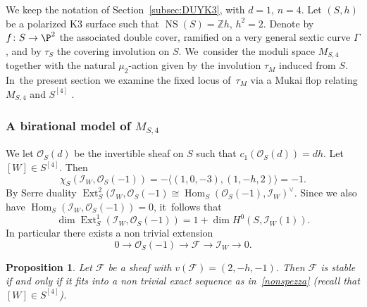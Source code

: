 \documentclass[JEP,XML,SOM,Unicode,published]{cedram}
\newcommand{\ZZ}{{\mathbb Z}}\let\Z\ZZ
\newcommand\cF{\mathcal{F}}
\newcommand\cI{\mathcal{I}}
\newcommand\cO{\mathcal{O}}
\DeclareMathOperator{\Ext}{Ext}
\DeclareMathOperator{\Hom}{Hom}
\DeclareMathOperator{\NS}{NS}
\let\la\langle
\newtheorem{prop}[lemm]{Proposition}
\theoremstyle{definition}
\begin{document}
We keep the notation of Section~\ref{subsec:DUYK3}, with $d=1$, $n=4$.
Let $(S,h)$ be a polarized K3 surface such that $\NS(S)=\ZZ h$, $h^2=2$. Denote by $f\colon S\to \P^2$ the associated double cover, ramified on a very general sextic curve $\mathsf{\Gamma}$, and by $\tau_S$ the covering involution on $S$. We~consider the moduli space $M_{S,4}$ together with the natural $\mu_2$-action given by the involution $\tau_M$ induced from $S$. In~the present section we examine the fixed locus of~$\tau_M$ via a Mukai flop relating $M_{S,4}$ and $S^{[4]}$ .

\subsubsection*{A birational model of $M_{S,4}$}

We let $\cO_S(d)$ be the invertible sheaf on $S$ such that $c_1(\cO_S(d))=dh$.
Let $[W]\in S^{[4]}$. Then
\begin{equation*}
\chi_S(\cI_W,\cO_S(-1))=-\la (1,0,-3),(1,-h,2)\rangle=-1.
\end{equation*}
By Serre duality
$\Ext^2_S(\cI_W,\cO_S(-1)\cong \Hom_S(\cO_S(-1),\cI_W)^{\vee}$. Since we also have $\Hom_S(\cI_W,\cO_S(-1))=0$, it~follows that
\begin{equation}\label{extacca}
\dim\Ext^1_S(\cI_W,\cO_S(-1))=1+\dim H^0(S,\cI_W(1)).
\end{equation}
In particular there exists a non trivial extension
\begin{equation}\label{nonspezza}
0\to\cO_S(-1)\to\cF\to \cI_W\to 0.
\end{equation}

\begin{prop}\label{prop:hirschen}
Let $\cF$ be a sheaf with $v(\cF)=(2,-h,-1)$. Then $\cF$ is stable if and only if it fits into a non trivial exact sequence as in~\eqref{nonspezza} (recall that $[W]\in S^{[4]}$).
\end{prop}
\end{document}
